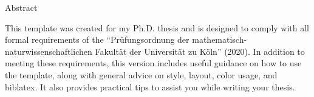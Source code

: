 \cleardoublepage
\thispagestyle{empty}

\begin{center}
{\color{accentcolor2} \mainregular \Huge Abstract} 
\end{center}
\vspace{1cm}

This template was created for my Ph.D. thesis and is designed to comply with all formal requirements of the ``Prüfungsordnung der mathematisch-naturwissenschaftlichen Fakultät der Universität zu Köln'' (2020). In addition to meeting these requirements, this version includes useful guidance on how to use the template, along with general advice on style, layout, color usage, and biblatex. It also provides practical tips to assist you while writing your thesis.




